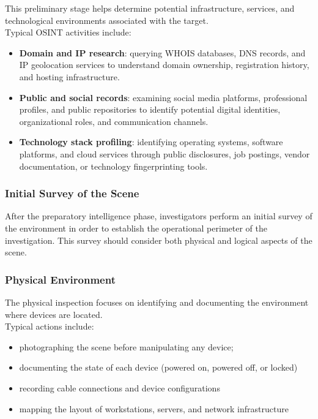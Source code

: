 \noindent
This preliminary stage helps determine potential infrastructure, services, and technological environments associated with the target.
\\
Typical OSINT activities include:

\begin{itemize}
\item \textbf{Domain and IP research}: querying WHOIS databases, DNS records, and IP geolocation services to understand domain ownership, registration history, and hosting infrastructure.
\item \textbf{Public and social records}: examining social media platforms, professional profiles, and public repositories to identify potential digital identities, organizational roles, and communication channels.
\item \textbf{Technology stack profiling}: identifying operating systems, software platforms, and cloud services through public disclosures, job postings, vendor documentation, or technology fingerprinting tools.
\end{itemize}

\subsubsection{Initial Survey of the Scene}

After the preparatory intelligence phase, investigators perform an initial survey of the environment in order to establish the operational perimeter of the investigation. This survey should consider both physical and logical aspects of the scene.

\subsubsection*{Physical Environment}

The physical inspection focuses on identifying and documenting the environment where devices are located.
\\
Typical actions include:

\begin{itemize}
\item photographing the scene before manipulating any device;
\item documenting the state of each device (powered on, powered off, or locked)
\item recording cable connections and device configurations
\item mapping the layout of workstations, servers, and network infrastructure
\end{itemize}

